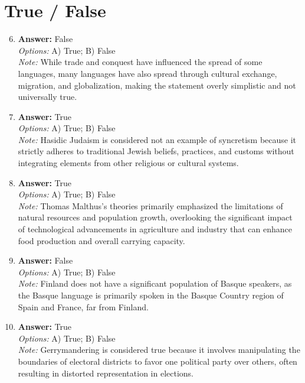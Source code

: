 \documentclass[12pt]{article}
\begin{document}
\section*{True / False}
\begin{enumerate}[label=\arabic*.]
\setcounter{enumi}{5}
\item \textbf{Answer:} False
\\ \textit{Options:} A) True; B) False
\\ \textit{Note:} While trade and conquest have influenced the spread of some languages, many languages have also spread through cultural exchange, migration, and globalization, making the statement overly simplistic and not universally true.
\item \textbf{Answer:} True
\\ \textit{Options:} A) True; B) False
\\ \textit{Note:} Hasidic Judaism is considered not an example of syncretism because it strictly adheres to traditional Jewish beliefs, practices, and customs without integrating elements from other religious or cultural systems.
\item \textbf{Answer:} True
\\ \textit{Options:} A) True; B) False
\\ \textit{Note:} Thomas Malthus's theories primarily emphasized the limitations of natural resources and population growth, overlooking the significant impact of technological advancements in agriculture and industry that can enhance food production and overall carrying capacity.
\item \textbf{Answer:} False
\\ \textit{Options:} A) True; B) False
\\ \textit{Note:} Finland does not have a significant population of Basque speakers, as the Basque language is primarily spoken in the Basque Country region of Spain and France, far from Finland.
\item \textbf{Answer:} True
\\ \textit{Options:} A) True; B) False
\\ \textit{Note:} Gerrymandering is considered true because it involves manipulating the boundaries of electoral districts to favor one political party over others, often resulting in distorted representation in elections.
\end{enumerate}
\end{document}

